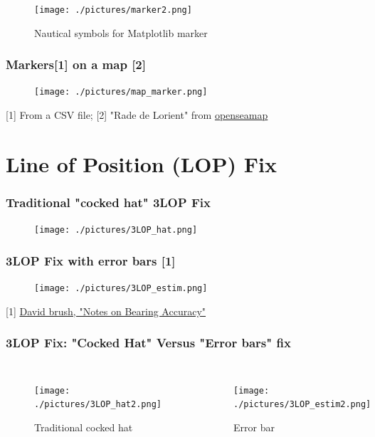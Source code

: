 \documentclass{beamer}
\begin{document}
\begin{frame}
    \begin{figure}[h]
    \centering
    \texttt{[image: ./pictures/marker2.png]}
    \caption{Nautical symbols for Matplotlib marker  }
    \end{figure}

\end{frame}


\begin{frame}
    \frametitle{Markers[1] on a map [2]}
    \begin{figure}[h]
    \centering
    \texttt{[image: ./pictures/map\_marker.png]}
    \end{figure}
    [1] From a CSV file;  [2] "Rade de Lorient" from \href{https://www.openseamap.org/}{openseamap}
\end{frame}

\section{Line of Position (LOP) Fix}

\begin{frame}
    \frametitle{Traditional "cocked hat" 3LOP Fix}
    \begin{figure}[h]
    \centering
    \texttt{[image: ./pictures/3LOP\_hat.png]}
    \end{figure}
\end{frame}


\begin{frame}
    \frametitle{3LOP Fix with error bars [1]}
    \begin{figure}[h]
    \centering
    \texttt{[image: ./pictures/3LOP\_estim.png]}
    \end{figure}

[1] \href{https://www.starpath.com/resources2/Bearing_Fix_Accuracy.pdf}{David brush, "Notes on Bearing Accuracy"}

\end{frame}


\begin{frame}
    \frametitle{3LOP Fix: "Cocked Hat" Versus "Error bars" fix}
    \begin{columns}
        \begin{figure}[h]
        \caption{Traditional cocked hat}
        \centering
        \texttt{[image: ./pictures/3LOP\_hat2.png]}
        \end{figure}
    
        \begin{figure}[h]
        \caption{Error bar }
        \centering
        \texttt{[image: ./pictures/3LOP\_estim2.png]}
        \end{figure}
    \end{columns}
\end{frame}
\end{document}
